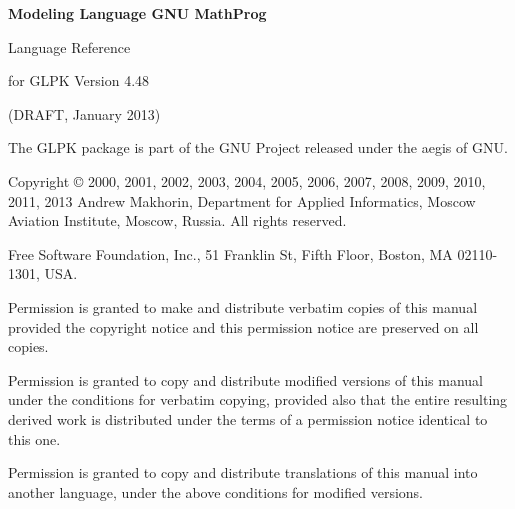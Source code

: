 \documentclass[10pt]{article}
\begin{document}
\thispagestyle{empty}

\begin{center}

\vspace*{1in}

\begin{huge}
\sf\bfseries Modeling Language GNU MathProg
\end{huge}

\vspace{0.5in}

\begin{LARGE}
\sf Language Reference
\end{LARGE}

\vspace{0.5in}

\begin{LARGE}
\sf for GLPK Version 4.48
\end{LARGE}

\vspace{0.5in}
\begin{Large}
\sf (DRAFT, January 2013)
\end{Large}

\end{center}

\newpage

\vspace*{1in}

\vfill

\noindent
The GLPK package is part of the GNU Project released under the aegis of
GNU.

\medskip\noindent
Copyright \copyright{} 2000, 2001, 2002, 2003, 2004, 2005, 2006, 2007,
2008, 2009, 2010, 2011, 2013 Andrew Makhorin, Department for Applied
Informatics, Moscow Aviation Institute, Moscow, Russia. All rights
reserved.

\medskip\noindent
Free Software Foundation, Inc., 51 Franklin St, Fifth Floor, Boston,
MA 02110-1301, USA.

\medskip\noindent
Permission is granted to make and distribute verbatim copies of this
manual provided the copyright notice and this permission notice are
preserved on all copies.

\medskip\noindent
Permission is granted to copy and distribute modified versions of this
manual under the conditions for verbatim copying, provided also that
the entire resulting derived work is distributed under the terms of
a permission notice identical to this one.

\medskip\noindent
Permission is granted to copy and distribute translations of this
manual into another language, under the above conditions for modified
versions.
\end{document}
